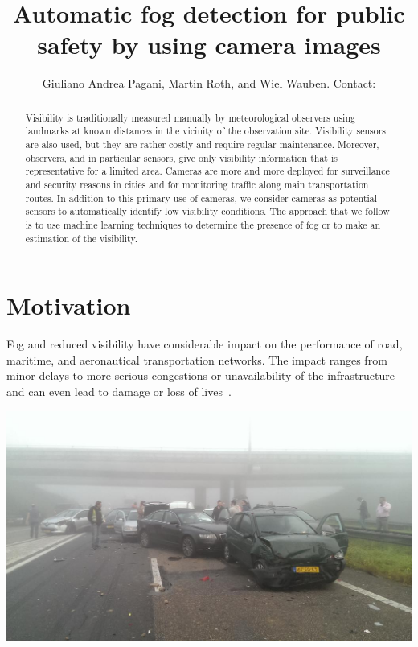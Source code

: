 \documentclass{article}
\title{Automatic fog detection for public safety by using camera images}
\author{Giuliano Andrea Pagani\affil{1}, Martin Roth\affil{1}, and Wiel Wauben\affil{1}. Contact: \email{pagani@knmi.nl}}
\begin{document}
\maketitle

\begin{abstract}
\begin{multicols}{2}
Visibility is traditionally measured manually by meteorological observers using landmarks at known distances in
the vicinity of the observation site. 
Visibility sensors are also used, but they are rather costly and
require regular maintenance. Moreover, observers, and in particular sensors, give only visibility information that is
representative for a limited area. 
Cameras are more and more deployed for surveillance and security reasons in cities and for monitoring traffic along
main transportation routes. In addition to this primary use of cameras, we consider cameras as potential sensors to
automatically identify low visibility conditions. 
The approach that we follow is to use machine learning techniques
to determine the presence of fog or to make an estimation of the visibility. 
\end{multicols}
\end{abstract}

\bcols %

\section*{Motivation}
Fog and reduced visibility have considerable impact on the performance of road, maritime, and aeronautical transportation
networks. The impact ranges from minor delays to more serious congestions or unavailability of the
infrastructure and can even lead to damage or loss of lives~\cite{gultepe2007fog}.

\begin{minipage}[b]{\columnwidth}
	\begin{center}
	\includegraphics[width=0.9\columnwidth]{Accident}
	\label{figAccident}
	\end{center}
\end{minipage}
\vspace{-2cm}
\end{document}
